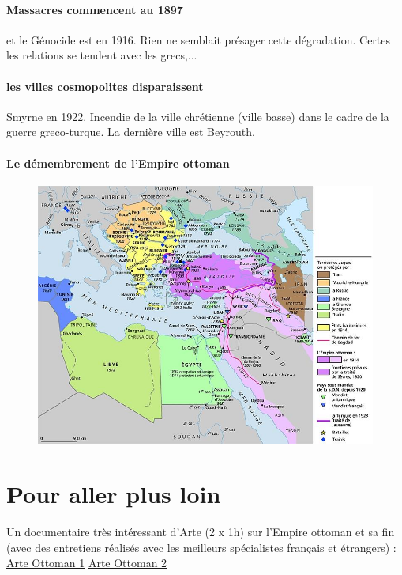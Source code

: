  \paragraph{Massacres commencent au 1897} et le Génocide est en 1916. Rien ne semblait présager cette dégradation. Certes les relations se tendent avec les grecs,...

 \paragraph{les villes cosmopolites disparaissent} Smyrne en 1922. Incendie de la ville chrétienne (ville basse) dans le cadre de la guerre greco-turque. 
 La dernière ville est Beyrouth. 


\paragraph{Le démembrement de
l’Empire ottoman}
\begin{figure}
    \centering
    \includegraphics[width=\textwidth]{HistoireIslamMediterranee/Images/DemembrementEmpireOttoman2.jpg}

    \label{fig:my_label}
\end{figure}

 \section{Pour aller plus loin}

 Un documentaire très intéressant d’Arte (2 x 1h) sur l’Empire ottoman
et sa fin (avec des entretiens réalisés avec les meilleurs spécialistes
français et étrangers) :
\href{https://www.dailymotion.com/video/x4a7vu8}{Arte Ottoman 1}
\href{Https://www.dailymotion.com/video/x3zpz4e}{Arte Ottoman 2}

